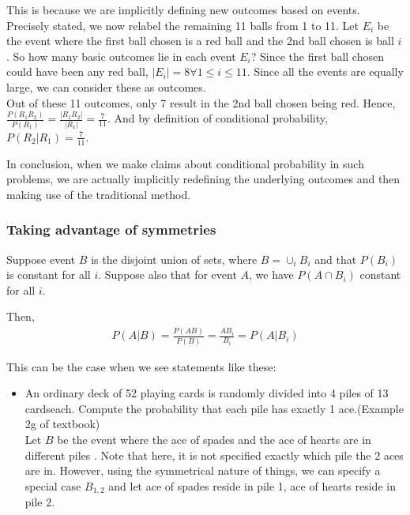 \documentclass{article}
\begin{document}
This is because we are implicitly defining new outcomes based on events. Precisely stated, we now relabel the remaining 11 balls from 1 to 11. Let $E_i$ be the event where the first ball chosen is a red ball and the 2nd ball chosen is ball $i$. So how many basic outcomes lie in each event $E_i$? Since the first ball chosen could have been any red ball, $|E_i|=8 \forall 1\leq i\leq 11$. Since all the events are equally large, we can consider these as outcomes.\\
Out of these 11 outcomes, only 7 result in the 2nd ball chosen being red. Hence, $\frac{P(R_1R_2)}{P(R_1)}=\frac{|R_1R_2|}{|R_1|}=\frac{7}{11}$. And by definition of conditional probability, $P(R_2|R_1)=\frac{7}{11}$.

In conclusion, when we make claims about conditional probability in such problems, we are actually implicitly redefining the underlying outcomes and then making use of the traditional method.


\subsubsection{Taking advantage of symmetries}
Suppose event $B$ is the disjoint union of sets, where $B=\cup_i B_i$ and that $P(B_i)$ is constant for all $i$. Suppose also that for event $A$, we have $P(A\cap B_i)$ constant for all $i$.

Then, \begin{align*}
	P(A|B)=\frac{P(AB)}{P(B)}=\frac{AB_i}{B_i}=P(A|B_i)
\end{align*}

This can be the case when we see statements like these:
\begin{itemize}
	\item An ordinary deck of 52 playing cards is randomly divided into 4 piles of 13 cardseach. Compute the probability that each pile has exactly 1 ace.(Example 2g of textbook)\\
Let $B$ be the event where the ace of spades and the ace of hearts are in different piles . Note that here, it is not specified exactly which pile the 2 aces are in. However, using the symmetrical nature of things, we can specify a special case $B_{1,2}$ and let ace of spades reside in pile 1, ace of hearts reside in pile 2.
\end{itemize}
\end{document}
